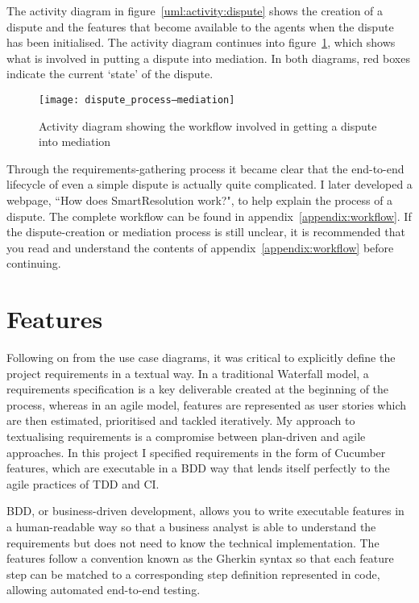 The activity diagram in figure~\ref{uml:activity:dispute} shows the creation of a dispute and the features that become available to the agents when the dispute has been initialised. The activity diagram continues into figure~\ref{uml:activity:mediation}, which shows what is involved in putting a dispute into mediation. In both diagrams, red boxes indicate the current `state' of the dispute.

\begin{figure}[h!]
  \centering
    \ifimages
    \texttt{[image: dispute\_process--mediation]}
    \fi
  \caption{Activity diagram showing the workflow involved in getting a dispute into mediation}
  \label{uml:activity:mediation}
\end{figure}

Through the requirements-gathering process it became clear that the end-to-end lifecycle of even a simple dispute is actually quite complicated. I later developed a webpage, ``How does SmartResolution work?", to help explain the process of a dispute. The complete workflow can be found in appendix~\ref{appendix:workflow}. If the dispute-creation or mediation process is still unclear, it is recommended that you read and understand the contents of appendix~\ref{appendix:workflow} before continuing.

\section{Features}

Following on from the use case diagrams, it was critical to explicitly define the project requirements in a textual way. In a traditional Waterfall model, a requirements specification is a key deliverable created at the beginning of the process, whereas in an agile model, features are represented as user stories which are then estimated, prioritised and tackled iteratively. My approach to textualising requirements is a compromise between plan-driven and agile approaches. In this project I specified requirements in the form of Cucumber features, which are executable in a BDD way that lends itself perfectly to the agile practices of TDD and CI.

BDD, or business-driven development, allows you to write executable features in a human-readable way so that a business analyst is able to understand the requirements but does not need to know the technical implementation. The features follow a convention known as the Gherkin syntax so that each feature step can be matched to a corresponding step definition represented in code, allowing automated end-to-end testing.


